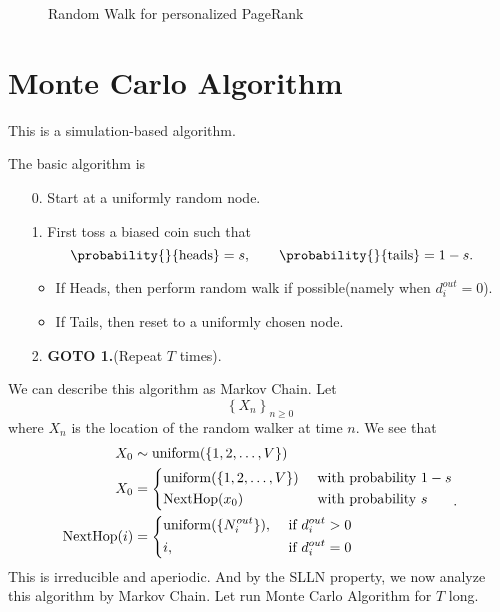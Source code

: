 \begin{figure}[H]
	\centering
	\caption{Random Walk for personalized PageRank}
	\label{fig:personalized-pagerank}
\end{figure}

\section{Monte Carlo Algorithm}
\begin{note}
	This is a simulation-based algorithm.
\end{note}

The basic algorithm is
\begin{enumerate}
	\item[0.] Start at a uniformly random node.
	\item[1.] First toss a biased coin such that
		\[
			\probability{}{\text{heads}} = s,\qquad \probability{}{\text{tails}} = 1 - s.
		\]
		\begin{itemize}
			\item If Heads, then perform random walk if possible(namely when \(d_i^{out}=0\)).
			\item If Tails, then reset to a uniformly chosen node.
		\end{itemize}
	\item[2.] \textbf{GOTO 1.}(Repeat \(T\) times).
\end{enumerate}

We can describe this algorithm as Markov Chain. Let
\[
	\left\{ X_n \right\}_{n\geq 0}
\]
where \(X_n\) is the location of the random walker at time \(n\). We see that
\[
	\begin{split}
		X_0 &\sim \mathrm{uniform}(\{1, 2, \ldots , V\})\\
		X_0 &=\begin{dcases}
			\mathrm{uniform}(\{1, 2, \ldots , V\}) & \text{ with probability }1 - s \\
			\mathrm{NextHop}(x_0)                  & \text{ with probability }s     \\
		\end{dcases}\\
		\mathrm{NextHop}(i)&=\begin{dcases}
			\mathrm{uniform}(\{N^{out}_i\}), & \text{ if }d^{out}_i>0   \\
			i,                               & \text{ if }d^{out}_i = 0
		\end{dcases}
	\end{split}.
\]
This is irreducible and aperiodic. And by the SLLN property, we now analyze this algorithm by Markov Chain. Let run Monte Carlo Algorithm
for \(T\) long.

